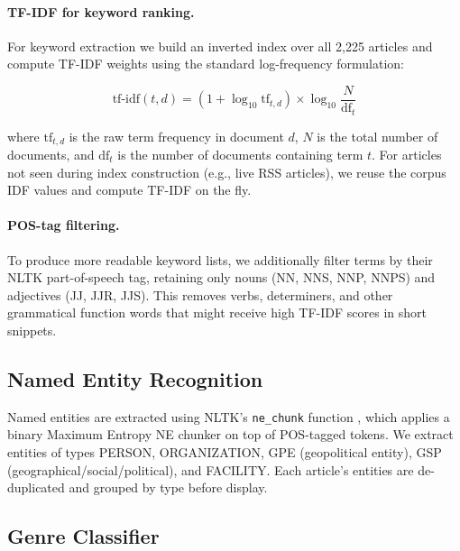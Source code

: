 \paragraph{TF-IDF for keyword ranking.}
For keyword extraction we build an inverted index over all 2,225 articles and compute TF-IDF weights using the standard log-frequency formulation:

\[
\text{tf-idf}(t, d) = (1 + \log_{10} \text{tf}_{t,d}) \times \log_{10}\frac{N}{\text{df}_t}
\]

where $\text{tf}_{t,d}$ is the raw term frequency in document $d$, $N$ is the total number of documents, and $\text{df}_t$ is the number of documents containing term $t$. For articles not seen during index construction (e.g., live RSS articles), we reuse the corpus IDF values and compute TF-IDF on the fly.

\paragraph{POS-tag filtering.}
To produce more readable keyword lists, we additionally filter terms by their NLTK part-of-speech tag, retaining only nouns (NN, NNS, NNP, NNPS) and adjectives (JJ, JJR, JJS). This removes verbs, determiners, and other grammatical function words that might receive high TF-IDF scores in short snippets.


\subsection{Named Entity Recognition}

Named entities are extracted using NLTK's \texttt{ne\_chunk} function \cite{bird2009natural}, which applies a binary Maximum Entropy NE chunker on top of POS-tagged tokens. We extract entities of types PERSON, ORGANIZATION, GPE (geopolitical entity), GSP (geographical/social/political), and FACILITY. Each article's entities are de-duplicated and grouped by type before display.

\subsection{Genre Classifier}

